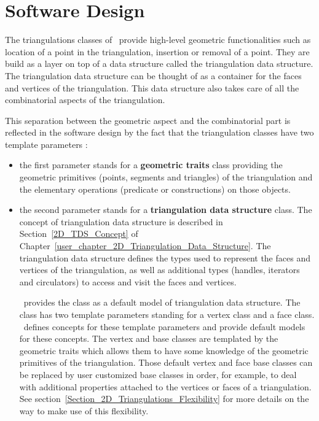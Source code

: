 \section{Software Design\label{Section_2D_Triangulations_Software_Design}}

The triangulations  classes of \cgal\  
provide high-level geometric functionalities
such as location of a point in the triangulation, insertion
or removal of a point.
They are build as a layer on top of a data structure
called the triangulation data structure.
The triangulation data structure   can be thought 
of as a container for the faces and vertices of the triangulation.
This data structure  also takes care
of all the combinatorial aspects of the triangulation.

This separation between the
geometric aspect and the combinatorial part
is reflected in the software design by the fact
that the triangulation classes have two template parameters :

\begin{itemize}
\item {} the first parameter stands for a
\textbf{geometric traits} class providing 
the geometric primitives (points, segments and triangles) 
of  the triangulation and the elementary
operations (predicate or constructions) on those objects.

\item {} the second parameter stands for a
\textbf{triangulation data structure} class. The concept
of triangulation data structure is described in
 Section~\ref{2D_TDS_Concept} of
Chapter~\ref{user_chapter_2D_Triangulation_Data_Structure}.
The triangulation data structure defines the types
used to represent the faces and vertices of the triangulation,
as well as additional types (handles, iterators and circulators)
to access and visit the faces and vertices.

\cgal\ provides the class 
as a  default model of triangulation data structure.
The class \ccc{Triangulation_data_structure_2<Vb,Fb>}
has two template parameters standing for
a vertex class and a face class.
\cgal\ defines concepts 
for these template parameters
and provide default models for these concepts.
The vertex and base classes are templated by the geometric
traits which allows them to have some knowledge of the geometric
primitives of the triangulation. 
Those default vertex and  face base classes
can be replaced by 
user customized base classes in order, for example, to deal
with additional properties attached to the vertices or faces
of a triangulation. See section~\ref{Section_2D_Triangulations_Flexibility}
for more details on the way to make use of this flexibility.
\end{itemize}

